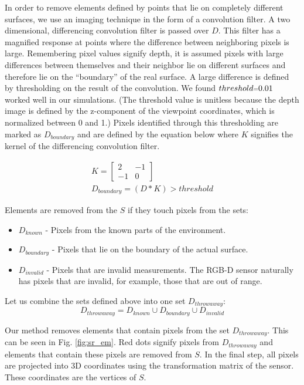 In order to remove elements defined by points that lie on completely different
surfaces, we use an imaging technique in the form of a convolution filter. A two
dimensional, differencing convolution filter is passed over $D$. This filter has
a magnified response at points where the difference between neighboring pixels
is large. Remembering pixel values signify depth, it is assumed pixels with
large differences between themselves and their neighbor lie on different
surfaces and therefore lie on the ``boundary'' of the real surface. A large
difference is defined by thresholding on the result of the convolution. We found
$threshold\mathsmaller{=}0.01$ worked well in our simulations. (The threshold
value is unitless because the depth image is defined by the z-component of the
viewpoint coordinates, which is normalized between 0 and 1.) Pixels identified
through this thresholding are marked as $D_{boundary}$ and are defined by the
equation below where $K$ signifies the kernel of the differencing convolution
filter.

\begin{gather}
  K = \begin{bmatrix} 2 & -1 \\ -1 & 0 \end{bmatrix} \\
  D_{boundary} = (D \ast K) > threshold
\end{gather}

Elements are removed from the $S$ if they touch pixels from the sets:
\begin{itemize}
  \item $D_{known}$ - Pixels from the known parts of the environment.
  \item $D_{boundary}$ - Pixels that lie on the boundary of the actual surface.
  \item $D_{invalid}$ -  Pixels that are invalid measurements. The RGB-D sensor
  naturally has pixels that are invalid, for example, those that are out of
  range.
\end{itemize}

Let us combine the sets defined above into one set $D_{throwaway}$:
\begin{equation}
D_{throwaway} = D_{known} \cup D_{boundary} \cup D_{invalid}
\end{equation}

Our method removes elements that contain pixels from the set $D_{throwaway}$.
This can be seen in Fig. \ref{fig:sr_em}. Red dots signify pixels from
$D_{throwaway}$ and elements that contain these pixels are removed from $S$. In
the final step, all pixels are projected into 3D coordinates using the
transformation matrix of the sensor. These coordinates are the vertices of $S$.

